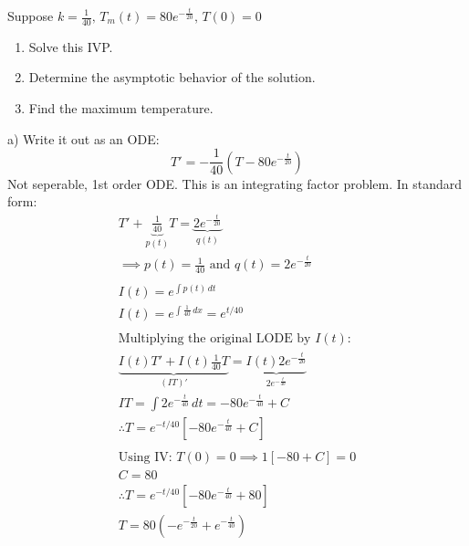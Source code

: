 \documentclass[../main.tex]{subfiles}
\begin{document}
\begin{example}[]
    Suppose \( k=\frac{1}{40},\, T_m(t)=80e^{-\frac{t}{20}},\,T(0)=0 \)
    \begin{enumerate}[label=\alph*)]
        \item Solve this IVP.
        \item Determine the asymptotic behavior of the solution.
        \item Find the maximum temperature.
    \end{enumerate}

    a) Write it out as an ODE: \[ T'=-\frac{1}{40}(T-80e^{-\frac{t}{20}}) \]
    Not seperable, 1st order ODE. This is an integrating factor problem.
    In standard form:
    \begin{gather*}
        T' + \underbrace{\frac{1}{40}}_{p(t)} T = \underbrace{2e^{-\frac{t}{20}}}_{q(t)} \\
        \implies p(t) = \frac{1}{40} \text{ and } q(t) = 2e^{-\frac{t}{20}} \\
        \\
        I(t) = e^{\int p(t) \,dt} \\
        I(t) = e^{\int \frac{1}{40} \,dx} = e^{t/40} \\
        \\
        \text{Multiplying the original LODE by } I(t) \text{:}\\
        \underbrace{I(t)T' + I(t)\frac{1}{40}T}_{(IT)'} = \underbrace{I(t)2e^{-\frac{t}{20}}}_{2e^{-\frac{t}{40}}} \\
        IT=\int 2e^{-\frac{t}{40}} \,dt = -80e^{-\frac{t}{40}}+C \\
        \therefore T = e^{-t/40} \left[-80e^{-\frac{t}{40}}+C \right] \\
        \\
        \text{Using IV: } T(0)=0 \implies 1[-80+C]=0 \\
        C=80 \\
        \therefore T = e^{-t/40} \left[ -80e^{-\frac{t}{40}}+80 \right] \\
        \boxed{T=80\left(-e^{-\frac{t}{20}}+e^{-\frac{t}{40}}\right)}
    \end{gather*}


\end{example}
\end{document}
